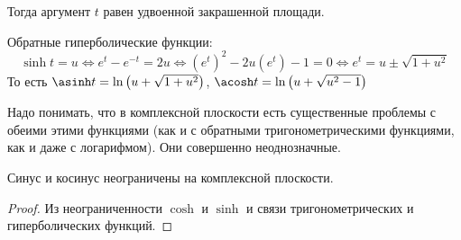 \documentclass{article}
\begin{document}
\begin{remark}
        \begin{figure}[H]
        \end{figure}
        Тогда аргумент $t$ равен удвоенной закрашенной площади.
    \end{remark}
    \begin{definition}
        Обратные гиперболические функции:\\
        $$
        \sinh t=u\Leftrightarrow e^t-e^{-t}=2u\Leftrightarrow(e^t)^2-2u(e^t)-1=0\Leftrightarrow e^t=u\pm\sqrt{1+u^2}
        $$
        То есть $\asinh t=\ln\left(u+\sqrt{1+u^2}\right)$, $\acosh t=\ln\left(u+\sqrt{u^2-1}\right)$
    \end{definition}
    \begin{remark}
        Надо понимать, что в комплексной плоскости есть существенные проблемы с обеими этими функциями (как и с обратными тригонометрическими функциями, как и даже с логарифмом). Они совершенно неоднозначные.
    \end{remark}
    \begin{property}
        Синус и косинус неограничены на комплексной плоскости.
    \end{property}
    \begin{proof}
        Из неограниченности $\cosh$ и $\sinh$ и связи  тригонометрических и гиперболических функций.
    \end{proof}
\end{document}
